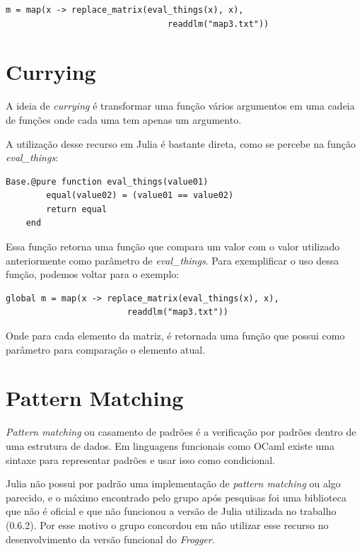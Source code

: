 \documentclass[rel_mlp]{iiufrgs}
\begin{document}
    \begin{lstlisting}[frame=single]
    m = map(x -> replace_matrix(eval_things(x), x),
                                readdlm("map3.txt"))
    \end{lstlisting}
 
 \section{Currying}
    
    A ideia de \textit{currying} é transformar uma função vários argumentos em uma cadeia de funções onde cada uma tem apenas um argumento.
    
    A utilização desse recurso em Julia é bastante direta, como se percebe na função \textit{eval\_things}:
    \begin{lstlisting}[frame=single]
    Base.@pure function eval_things(value01)
    	equal(value02) = (value01 == value02)
    	return equal
    end
    \end{lstlisting}
    
    Essa função retorna uma função que compara um valor com o valor utilizado anteriormente como parâmetro de \textit{eval\_things}. Para exemplificar o uso dessa função, podemos voltar para o exemplo:
    
    \begin{lstlisting}[frame=single]
    global m = map(x -> replace_matrix(eval_things(x), x),
                        readdlm("map3.txt"))
    \end{lstlisting}
    
    Onde para cada elemento da matriz, é retornada uma função que possui como parâmetro para comparação o elemento atual.
    
 
 \section{Pattern Matching}
 
    \textit{Pattern matching} ou casamento de padrões é a verificação por padrões dentro de uma estrutura de dados. Em linguagens funcionais como OCaml existe uma sintaxe para representar padrões e usar isso como condicional.
    
    Julia não possui por padrão uma implementação de \textit{pattern matching} ou algo parecido, e o máximo encontrado pelo grupo após pesquisas foi uma biblioteca que não é oficial e que não funcionou a versão de Julia utilizada no trabalho (0.6.2). Por esse motivo o grupo concordou em não utilizar esse recurso no desenvolvimento da versão funcional do \textit{Frogger}.
  
\end{document}
